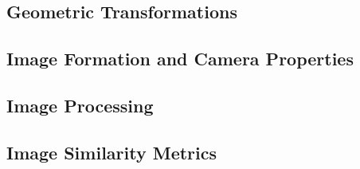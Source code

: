 \subsection{Geometric Transformations}
\label{sec:geometric-transformations}


\subsection{Image Formation and Camera Properties}
\label{sec:img-form-camera-props}


\subsection{Image Processing}
\label{sec:image-processing}


\subsection{Image Similarity Metrics}
\label{sec:image-similarity}

